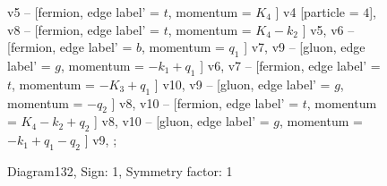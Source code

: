 \documentclass{revtex4}
\begin{document}
\begin{figure}[!htb]
\begin{center}
{v5 -- [fermion, edge label' = \(t\), momentum = \(K_{4}\) ] v4 [particle = \(4\)], 
v8 -- [fermion, edge label' = \(t\), momentum = \(K_{4} - k_{2}\) ] v5, 
v6 -- [fermion, edge label' = \(b\), momentum = \(q_{1}\) ] v7, 
v9 -- [gluon, edge label' = \(g\), momentum = \(-k_{1} + q_{1}\) ] v6, 
v7 -- [fermion, edge label' = \(t\), momentum = \(-K_{3} + q_{1}\) ] v10, 
v9 -- [gluon, edge label' = \(g\), momentum = \(-q_{2}\) ] v8, 
v10 -- [fermion, edge label' = \(t\), momentum = \(K_{4} - k_{2} + q_{2}\) ] v8, 
v10 -- [gluon, edge label' = \(g\), momentum = \(-k_{1} + q_{1} - q_{2}\) ] v9, 
};
\end{center}
\caption{Diagram132, Sign: 1, Symmetry factor: 1}
\end{figure}
\newpage
\end{document}
